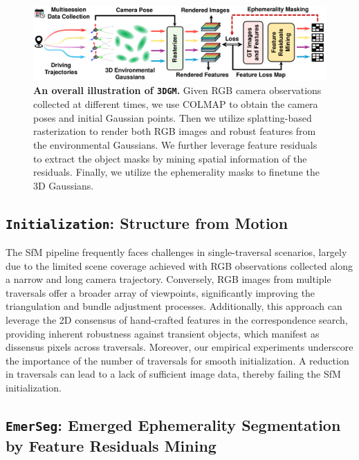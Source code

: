 \begin{figure}[t]
\begin{center}
\centerline{\includegraphics[width=\columnwidth]{figs_compressed/overview_compressed.pdf}}
\vspace{3mm}
\caption{\textbf{An overall illustration of \texttt{3DGM}.} Given RGB camera observations collected at different times, we use COLMAP to obtain the camera poses and initial Gaussian points. Then we utilize splatting-based rasterization to render both RGB images and robust features from the environmental Gaussians. We further leverage feature residuals to extract the object masks by mining spatial information of the residuals. Finally, we utilize the ephemerality masks to finetune the 3D Gaussians. }
\label{fig:overall}
\end{center}
\vspace{-5mm}
\end{figure}

\subsection{\texttt{Initialization}: Structure from Motion}
\label{subsec:stage1}
The SfM pipeline frequently faces challenges in single-traversal scenarios, largely due to the limited scene coverage achieved with RGB observations collected along a narrow and long camera trajectory. Conversely, RGB images from multiple traversals offer a broader array of viewpoints, significantly improving the triangulation and bundle adjustment processes. Additionally, this approach can leverage the 2D consensus of hand-crafted features in the correspondence search, providing inherent robustness against transient objects, which manifest as dissensus pixels across traversals. Moreover, our empirical experiments underscore the importance of the number of traversals for smooth initialization. A reduction in traversals can lead to a lack of sufficient image data, thereby failing the SfM initialization.

\subsection{\texttt{EmerSeg}: Emerged Ephemerality Segmentation by Feature Residuals Mining}
\label{subsec:stage2}
